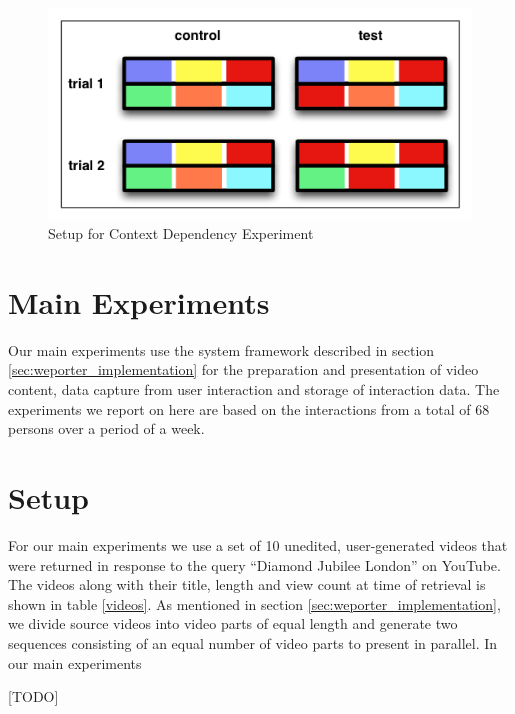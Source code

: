 \begin{figure}[htbp]
  \centering
    \includegraphics[width = .7\textwidth]{img/exp_context}
  \caption{Setup for Context Dependency Experiment}
  \label{fig:exp_context}
\end{figure}





\section{Main Experiments} %
\label{sec:main_experiments}

Our main experiments use the system framework described in section \ref{sec:weporter_implementation} for the preparation and presentation of video content, data capture from user interaction and storage of interaction data. The experiments we report on here are based on the interactions from a total of 68 persons over a period of a week.

\section{Setup}
For our main experiments we use a set of 10 unedited, user-generated videos that were returned in response to the query ``Diamond Jubilee London'' on YouTube. The videos along with their title, length and view count at time of retrieval is shown in table \ref{videos}. As mentioned in section \ref{sec:weporter_implementation}, we divide source videos into video parts of equal length and generate two sequences consisting of an equal number of video parts to present in parallel. In our main experiments 

[TODO]



